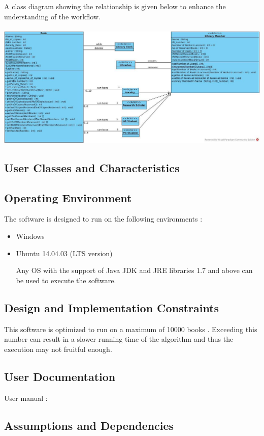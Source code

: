 \documentclass{article}
\begin{document}
A class diagram showing the relationship is given below to enhance the understanding of the workflow.
\\
\\
\includegraphics[scale=0.25]{images/classDiagram}

\subsection{User Classes and Characteristics}

\subsection{Operating Environment}
The software is designed to run on the following environments :
\begin{itemize}
\item Windows 
\item Ubuntu 14.04.03 (LTS version)

Any OS with the support of Java JDK and JRE libraries 1.7 and above can be used to execute the software.
\end{itemize}

\subsection{Design and Implementation Constraints}
This software is optimized to run on a maximum of 10000 books .
Exceeding this number can result in a slower running time of the algorithm and thus the execution may not fruitful enough.

\subsection{User Documentation}
User manual $:$

\subsection{Assumptions and Dependencies}
\end{document}
